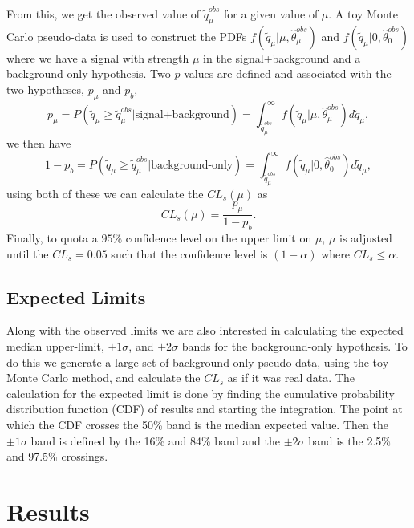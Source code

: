 From this, we get the observed value of $\widetilde{q}_\mu^{obs}$ for a given value of $\mu$. A toy Monte Carlo pseudo-data is used to construct the PDFs $f(\widetilde{q}_\mu|\mu,\hat{\theta}_\mu^{obs})$ and $f(\widetilde{q}_\mu|0,\hat{\theta}_0^{obs})$ where we have a signal with strength $\mu$ in the signal+background and a background-only hypothesis. Two $p$-values are defined and associated with the two hypotheses, $p_\mu$ and $p_b$,
\begin{equation}\label{eqn:splusb}
p_\mu=P(\widetilde{q}_\mu\geq\widetilde{q}_\mu^{obs}|\text{signal+background})=\int_{\widetilde{q}_\mu^{obs}}^{\infty}f(\widetilde{q}_\mu|\mu,\hat{\theta}_\mu^{obs})d\widetilde{q}_\mu,
\end{equation} \label{eqn:b}
we then have
\begin{equation}
1-p_b=P(\widetilde{q}_\mu\geq\widetilde{q}_\mu^{obs}|\text{background-only})=\int_{\widetilde{q}_\mu^{obs}}^{\infty}f(\widetilde{q}_\mu|0,\hat{\theta}_0^{obs})d\widetilde{q}_\mu,
\end{equation}
using both of these we can calculate the $CL_s(\mu)$ as 
\begin{equation}
CL_s(\mu)=\frac{p_\mu}{1-p_b}.
\end{equation}
Finally, to quota a $95\%$ confidence level on the upper limit on $\mu$, $\mu$ is adjusted until the $CL_s=0.05$ such that the confidence level is $(1-\alpha)$ where $CL_s\leq\alpha$. 

\subsection{Expected Limits}\label{sec:ExpLimits}

Along with the observed limits we are also interested in calculating the expected median upper-limit, $\pm1\sigma$, and $\pm2\sigma$ bands for the background-only hypothesis. To do this we generate a large set of background-only pseudo-data, using the toy Monte Carlo method, and calculate the $CL_s$ as if it was real data. The calculation for the expected limit is done by finding the cumulative probability distribution function (CDF) of results and starting the integration. The point at which the CDF crosses the 50\% band is the median expected value. Then the $\pm1\sigma$ band is defined by the 16\% and 84\% band and the $\pm2\sigma$ band is the 2.5\% and 97.5\% crossings. 

\section{Results}\label{sec:Results}

